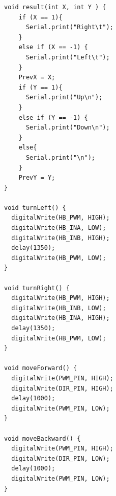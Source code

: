 \begin{verbatim}
void result(int X, int Y ) {
    if (X == 1){
      Serial.print("Right\t");
    }
    else if (X == -1) {
      Serial.print("Left\t");   
    }
    PrevX = X;
    if (Y == 1){
      Serial.print("Up\n");
    }
    else if (Y == -1) {
      Serial.print("Down\n");
    }
    else{
      Serial.print("\n");
    }          
    PrevY = Y;
}

void turnLeft() {
  digitalWrite(HB_PWM, HIGH);    
  digitalWrite(HB_INA, LOW); 
  digitalWrite(HB_INB, HIGH); 
  delay(1350); 
  digitalWrite(HB_PWM, LOW); 
}

void turnRight() {
  digitalWrite(HB_PWM, HIGH); 
  digitalWrite(HB_INB, LOW); 
  digitalWrite(HB_INA, HIGH);
  delay(1350); 
  digitalWrite(HB_PWM, LOW);
}

void moveForward() {
  digitalWrite(PWM_PIN, HIGH);
  digitalWrite(DIR_PIN, HIGH);
  delay(1000);
  digitalWrite(PWM_PIN, LOW);
}

void moveBackward() {
  digitalWrite(PWM_PIN, HIGH);
  digitalWrite(DIR_PIN, LOW);
  delay(1000);
  digitalWrite(PWM_PIN, LOW);
}
\end{verbatim}

